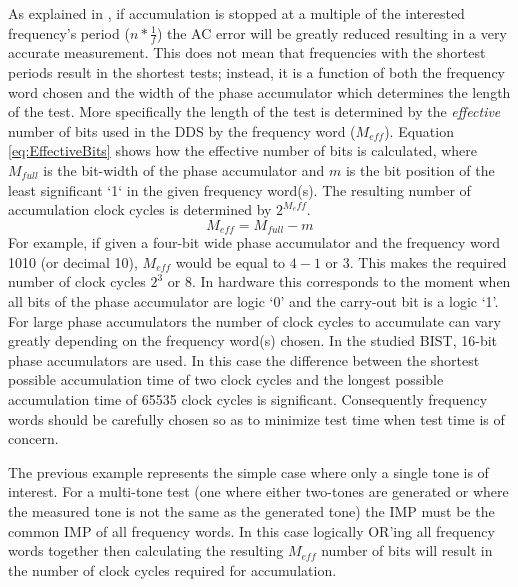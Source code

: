 \documentclass[12pt]{report}
\begin{document}
As explained in \cite{testtime}, if accumulation is stopped at a multiple of the interested frequency's period ($n*\frac{1}{f}$) the AC error will be greatly reduced resulting in a very accurate measurement.  This does not mean that frequencies with the shortest periods result in the shortest tests; instead, it is a function of both the frequency word chosen and the width of the phase accumulator which determines the length of the test.  More specifically the length of the test is determined by the \textit{effective} number of bits used in the DDS by the frequency word ($M_{eff}$).  Equation \ref{eq:EffectiveBits} shows how the effective number of bits is calculated, where $M_{full}$ is the bit-width of the phase accumulator and $m$ is the bit position of the least significant `1` in the given frequency word(s)\cite{jie}.  The resulting number of accumulation clock cycles is determined by $2^{M_eff}$.
\begin{equation}
	M_{eff} = M_{full} - m
	\label{eq:EffectiveBits}
\end{equation}
For example, if given a four-bit wide phase accumulator and the frequency word 1010 (or decimal 10), $M_{eff}$ would be equal to $4 - 1$ or 3.  This makes the required number of clock cycles $2^3$ or $8$.  In hardware this corresponds to the moment when all bits of the phase accumulator are logic `0' and the carry-out bit is a logic `1'\cite{jie}.  For large phase accumulators the number of clock cycles to accumulate can vary greatly depending on the frequency word(s) chosen.  In the studied BIST, 16-bit phase accumulators are used.  In this case the difference between the shortest possible accumulation time of two clock cycles and the longest possible accumulation time of 65535 clock cycles is significant.  Consequently frequency words should be carefully chosen so as to minimize test time when test time is of concern\cite{jie}.  

The previous example represents the simple case where only a single tone is of interest.  For a multi-tone test (one where either two-tones are generated or where the measured tone is not the same as the generated tone) the IMP must be the common IMP of all frequency words\cite{jie}.  In this case logically OR'ing all frequency words together then calculating the resulting $M_{eff}$ number of bits will result in the number of clock cycles required for accumulation\cite{jie}\cite{testtime}.
\end{document}
